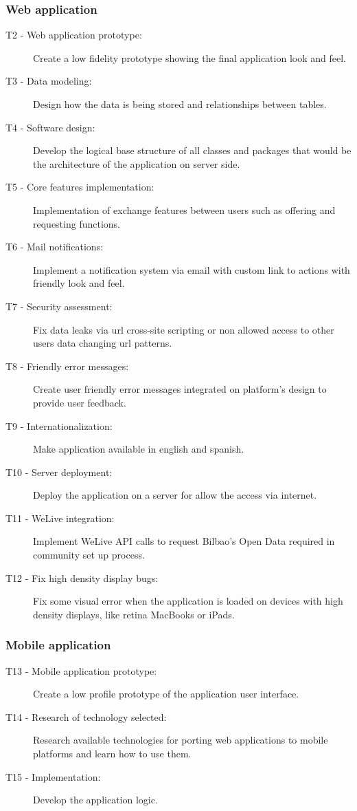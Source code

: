 \documentclass{DeustoFDP}
\begin{document}
\subsubsection{Web application}
\begin{description}
	\item[T2 - Web application prototype:] Create a low fidelity prototype showing the final application look and feel.
	\item[T3 - Data modeling:] Design how the data is being stored and relationships between tables. 
	\item[T4 - Software design:] Develop the logical base structure of all classes and packages that would be the architecture of the application on server side.
	\item[T5 - Core features implementation:] Implementation of exchange features between users such as offering and requesting functions.
	\item[T6 - Mail notifications:] Implement a notification system via email with custom link to actions with friendly look and feel.
	\item[T7 - Security assessment:] Fix data leaks via url cross-site scripting or non allowed access to other users data changing url patterns.
	\item[T8 - Friendly error messages:] Create user friendly error messages integrated on platform's design to provide user feedback.
	\item[T9 - Internationalization:] Make application available in english and spanish.
	\item[T10 - Server deployment:] Deploy the application on a server for allow the access via internet.
	\item[T11 - WeLive integration:] Implement WeLive API calls to request Bilbao's Open Data required in community set up process.
	\item[T12 - Fix high density display bugs:] Fix some visual error when the application is loaded on devices with high density displays, like retina MacBooks or iPads.
\end{description}

\subsubsection{Mobile application}
\begin{description}
	\item[T13 - Mobile application prototype:] Create a low profile prototype of the application user interface.
	\item[T14 - Research of technology selected:] Research available technologies for porting web applications to mobile platforms and learn how to use them.
	\item[T15 - Implementation:] Develop the application logic.
\end{description}
\end{document}
